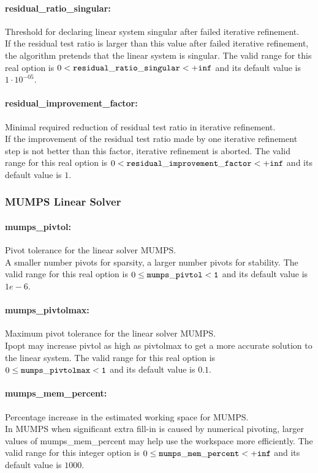 \paragraph{residual\_ratio\_singular:} Threshold for declaring linear system singular after failed iterative refinement. $\;$ \\
 If the residual test ratio is larger than this
value after failed iterative refinement, the
algorithm pretends that the linear system is
singular. The valid range for this real option is 
$0 <  {\tt residual\_ratio\_singular } <  {\tt +inf}$
and its default value is $1 \cdot 10^{-05}$.


\paragraph{residual\_improvement\_factor:} Minimal required reduction of residual test ratio in iterative refinement. $\;$ \\
 If the improvement of the residual test ratio
made by one iterative refinement step is not
better than this factor, iterative refinement is
aborted. The valid range for this real option is 
$0 <  {\tt residual\_improvement\_factor } <  {\tt +inf}$
and its default value is $1$.


\subsubsection{MUMPS Linear Solver}

\paragraph{mumps\_pivtol:} Pivot tolerance for the linear solver MUMPS. \\
A smaller number pivots for sparsity, a larger number pivots for stability.
The valid range for this real option is
$0 \le {\tt mumps\_pivtol } < {\tt 1}$
and its default value is $1e-6$.

\paragraph{mumps\_pivtolmax:} Maximum pivot tolerance for the linear solver MUMPS. \\
Ipopt may increase pivtol as high as pivtolmax to get a more accurate solution to the linear system.
The valid range for this real option is
$0 \le {\tt mumps\_pivtolmax } < {\tt 1}$
and its default value is $0.1$.

\paragraph{mumps\_mem\_percent:} Percentage increase in the estimated working space for MUMPS. \\
In MUMPS when significant extra fill-in is caused by numerical pivoting, larger values of mumps\_mem\_percent may help use the workspace more efficiently.
The valid range for this integer option is
$0 \le {\tt mumps\_mem\_percent } < {\tt +inf}$
and its default value is $1000$.

